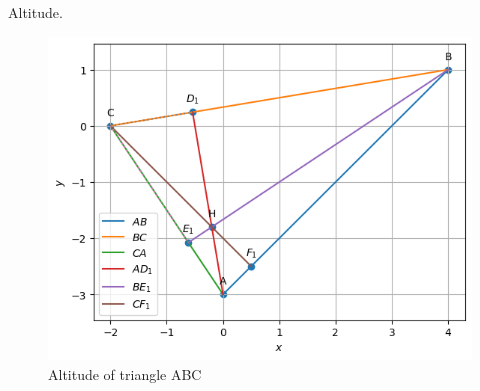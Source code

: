 \begin{table}[H]
        \centering
        
        \caption{Altitude.}
        \label{tab:altitude}
    \end{table}
\begin{figure}[H]
	\includegraphics[width=\columnwidth]{altitude/figs/altitude.png}
\caption{Altitude of triangle ABC}
\label{fig:i_altitude_py}
\end{figure}

